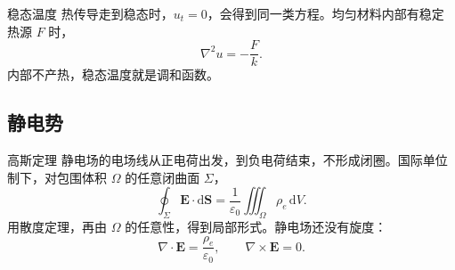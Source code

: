 \documentclass[fontset=windows, chinese, 10pt, xcolor=dvipsnames]{beamer}
\begin{document}
\begin{frame}{稳态温度}
  热传导走到稳态时，$u_t=0$，会得到同一类方程。均匀材料内部有稳定热源 $F$ 时，
  \begin{equation*}
    \nabla^2u=-\frac{F}{k}.
  \end{equation*}
  内部不产热，稳态温度就是调和函数。
  \vspace{0.35em}
\end{frame}




\subsection{静电势}

\begin{frame}{高斯定理}
  静电场的电场线从正电荷出发，到负电荷结束，不形成闭圈。国际单位制下，对包围体积 $\Omega$ 的任意闭曲面 $\Sigma$，
  \begin{equation*}
    \oint_{\Sigma}\mathbf{E}\cdot\mathrm{d}\mathbf{S}
    =\frac{1}{\varepsilon_0}\iiint_{\Omega}\rho_e\,\mathrm{d}V.
  \end{equation*}
  用散度定理，再由 $\Omega$ 的任意性，得到局部形式。静电场还没有旋度：
  \begin{equation*}
    \nabla\cdot\mathbf{E}=\frac{\rho_e}{\varepsilon_0},
    \qquad \nabla\times\mathbf{E}=0.
  \end{equation*}
\end{frame}
\end{document}
